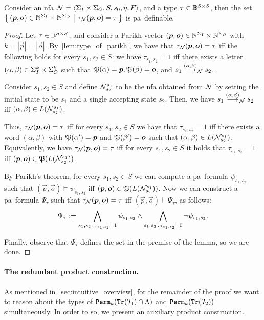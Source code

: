 \begin{lemma}
	\label{lem:parikh_type_definable}
	Consider an \gls{nfa} $\mathcal{N}=\left< \Sigma_{I}\times \Sigma_{O},S,s_0,\eta,F\right>$, and a type $\tau\in \mathbb{B}^{S\times S}$, then the set $\left\{\,(\boldsymbol{p},\boldsymbol{o})\in \mathbb{N}^{\Sigma_{I}} \times \mathbb{N}^{\Sigma_{O}}\ \middle|\ \tau_{\mathcal{N}}(\boldsymbol{p},\boldsymbol{o})=\tau\,\right\}$ is \gls{pa}~definable.
\end{lemma}
\begin{proof}
	Let $\tau\in \mathbb{B}^{S\times S}$, and consider a Parikh vector $(\boldsymbol{p},\boldsymbol{o})\in \mathbb{N}^{\Sigma_{I}} \times \mathbb{N}^{\Sigma_{O}}$ with $k=|\vec{p}|=|\vec{o}|$. By~\cref{lem:type_of_parikh}, we have that $\tau_{\mathcal{N}}(\boldsymbol{p},\boldsymbol{o})=\tau$ iff the following holds for every $s_1,s_2\in S$: we have $\tau_{s_1,s_2}=1$ iff 
	there exists a letter $(\alpha,\beta)\in \Sigma_{I}^k\times \Sigma_{O}^k$ such that $\mathfrak{P}(\alpha)=\boldsymbol{p},\mathfrak{P}(\beta)=\boldsymbol{o}$, and $s_1\stackrel{(\alpha,\beta)}{\longrightarrow}_{\mathcal{N}} s_2$.

	Consider $s_1,s_2\in S$ and define $\mathcal{N}^{s_1}_{s_2}$ to be the \gls{nfa} obtained from $\mathcal{N}$ by setting the initial state to be $s_1$ and a single accepting state $s_2$.
	Then, we have $s_1\stackrel{(\alpha,\beta)}{\longrightarrow}_{\mathcal{N}} s_2$ iff $(\alpha,\beta)\in L(\mathcal{N}^{s_1}_{s_2})$. 
	
	Thus, $\tau_{\mathcal{N}}(\boldsymbol{p},\boldsymbol{o})=\tau$ iff for every $s_1,s_2\in S$ we have that $\tau_{s_1,s_2}=1$ iff there exists a word $(\alpha,\beta)$ with $\mathfrak{P}(\alpha')=\boldsymbol{p}$ and $\mathfrak{P}(\beta')=\boldsymbol{o}$ such that $(\alpha,\beta)\in L(\mathcal{N}^{s_1}_{s_2})$.
	Equivalently, we have $\tau_{\mathcal{N}}(\boldsymbol{p},\boldsymbol{o})=\tau$ iff for every $s_1,s_2\in S$ it holds that $\tau_{s_1,s_2}=1$ iff $(\boldsymbol{p},\boldsymbol{o})\in \mathfrak{P}(L(\mathcal{N}^{s_1}_{s_2}))$.
	
	By Parikh's theorem, for every $s_1,s_2\in S$ we can compute a \gls{pa}~formula $\psi_{s_1,s_2}$ such that $(\vec{p},\vec{o})\models \psi_{s_1,s_2}$ iff $(\boldsymbol{p},\boldsymbol{o})\in \mathfrak{P}(L(\mathcal{N}^{s_1}_{s_2}))$. Now we can construct a \gls{pa}~formula $\Psi_{\tau}$ such that $\tau_{\mathcal{N}}(\boldsymbol{p},\boldsymbol{o})=\tau$ iff $(\vec{p},\vec{o})\models \Psi_\tau$, as follows:
	\[\Psi_\tau:= \bigwedge_{s_1,s_2\, :\, \tau_{s_1,s_2}=1} \psi_{s_1,s_2}\wedge \bigwedge_{s_1,s_2\, :\, \tau_{s_1,s_2}=0}\neg \psi_{s_1,s_2}.\]
	
	Finally, observe that $\Psi_\tau$ defines the set in the premise of the lemma, so we are done.
\end{proof}

\paragraph*{The redundant product construction.}
As mentioned in~\cref{sec:intuitive_overview}, for the remainder of the proof we want to reason about the types of ${\mathtt{Perm}}_k({\mathtt{Tr}}(\mathcal{T}_1)\cap \Lambda)$ and ${\mathtt{Perm}}_k({\mathtt{Tr}}(\mathcal{T}_2))$ simultaneously. In order to so, we present an auxiliary product construction.

